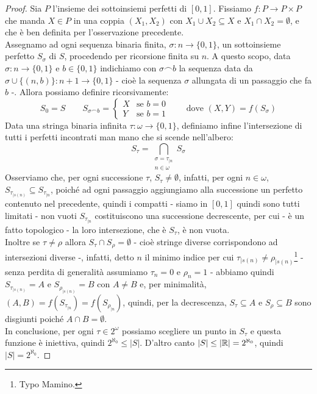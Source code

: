 \begin{proof}
	Sia $P$ l'insieme dei sottoinsiemi perfetti di $[0,1]$. Fissiamo $f : P \to P \times P$ che manda $X \in P$ in una coppia $(X_1,X_2)$ con $X_1 \cup X_2 \subseteq X$ e $X_1 \cap X_2 = \emptyset$, e che \`e ben definita per l'osservazione precedente.\\
	Assegnamo ad ogni sequenza binaria finita, $\sigma : n \to \{0,1\}$, un sottoinsieme perfetto $S_\sigma$ di $S$, procedendo per ricorsione finita su $n$. A questo scopo, data $\sigma : n \to \{0,1\}$ 
	e $b \in \{0,1\}$ indichiamo con $\sigma \frown b$ la sequenza data da $\sigma \cup \{(n,b)\} : n+1 \to \{0,1\}$ - cio\`e la sequenza $\sigma$ allungata di un passaggio che fa $b$ -. Allora possiamo definire ricorsivamente:
	\[ S_0 = S \qquad S_{\sigma \frown b} = \begin{cases}
		X &\text{se $b = 0$} \\
		Y &\text{se $b = 1$}
	\end{cases}
	\qquad \text{dove $(X,Y) = f(S_\sigma)$}
		\]
	Data una stringa binaria infinita $\tau : \omega \to \{0,1\}$, definiamo infine l'intersezione di tutti i perfetti incontrati man mano che si scende nell'albero:
	\[ S_\tau = \bigcap_{\substack{\sigma = \tau_{|n} \\ n \in \omega}} S_\sigma
		\]
	Osserviamo che, per ogni successione $\tau$, $S_\tau \ne \emptyset$, infatti, per ogni $n \in \omega$, $S_{\tau_{|s(n)}} \subseteq S_{\tau_{|n}}$, poich\'e ad ogni passaggio aggiungiamo alla successione un perfetto contenuto nel precedente,
	quindi i compatti - siamo in $[0,1]$ quindi sono tutti limitati - non vuoti $S_{\tau_{|n}}$ costituiscono una successione decrescente, per cui - \`e un fatto topologico - la loro intersezione, che \`e $S_{\tau}$, \`e non vuota.\\
	Inoltre se $\tau \ne \rho$ allora $S_\tau \cap S_\rho = \emptyset$ - cio\`e stringe diverse corrispondono ad intersezioni diverse -, infatti, detto $n$ il minimo indice per cui
	$\tau_{|s(n)} \ne \rho_{|s(n)}$\footnote{Typo Mamino.} - senza perdita di generalit\`a assumiamo $\tau_n = 0$ e $\rho_n = 1$ - abbiamo quindi $S_{\tau_{|s(n)}} = A$ e $S_{\rho_{|s(n)}} = B$ con $A \ne B$ e, per minimalit\`a, $(A,B) = f(S_{\tau_{|n}}) = f(S_{\rho_{|n}})$,
	quindi, per la decrescenza, $S_\tau \subseteq A$ e $S_\rho \subseteq B$ sono disgiunti poich\'e $A \cap B = \emptyset$.\\
	In conclusione, per ogni $\tau \in 2^\omega$ possiamo scegliere un punto in $S_\tau$ e questa funzione \`e 
	iniettiva, quindi $2^{\aleph_0} \leq |S|$. D'altro canto $|S| \leq |\mathbb R| = 2^{\aleph_0}$, quindi $|S| = 2^{\aleph_0}$.
\end{proof}

